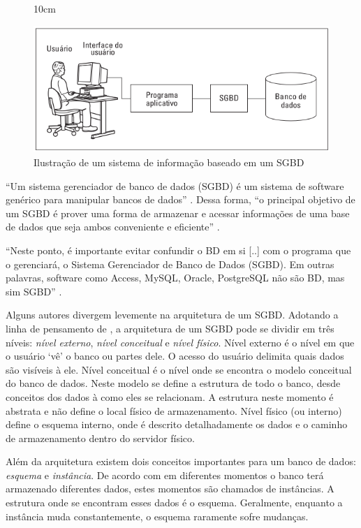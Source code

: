 \begin{figure}[!ht]{10cm}
  \caption{Ilustração de um sistema de informação baseado em um SGBD} \label{sgbd}
  \includegraphics[width=1\hsize]{figuras/esquema_sgbd.png}
\end{figure}
``Um sistema gerenciador de banco de dados (SGBD) é um
sistema de software genérico para manipular bancos de dados'' \cite[p.2]{teorey2014projeto}. Dessa forma, ``o principal objetivo de um SGBD é prover uma forma de armazenar e acessar informações de uma base de dados que seja ambos conveniente e eficiente'' \cite[p.1]{korth2010database}.

``Neste ponto, é importante evitar confundir o BD em si [..] com o programa que o gerenciará, o Sistema Gerenciador de Banco de Dados (SGBD). Em outras palavras, software como Access, MySQL, Oracle, PostgreSQL não são BD, mas sim SGBD'' \cite[p.2]{clickgeogeoprocessamento}.

Alguns autores divergem levemente na arquitetura de um SGBD. Adotando a linha de pensamento de , a arquitetura de um SGBD pode se dividir em três níveis: \textit{nível externo}, \textit{nível conceitual} e \textit{nível físico}.
Nível externo é o nível em que o usuário `vê' o banco ou partes dele. O acesso do usuário delimita quais dados são visíveis à ele.
Nível conceitual é o nível onde se encontra o modelo conceitual do banco de dados. Neste modelo se define a estrutura de todo o banco, desde conceitos dos dados à como eles se relacionam. A estrutura neste momento é abstrata e não define o local físico de armazenamento. 
Nível físico (ou interno) define o esquema interno, onde é descrito detalhadamente os dados e o caminho de armazenamento dentro do servidor físico. 

Além da arquitetura existem dois conceitos importantes para um banco de dados: \textit{esquema} e \textit{instância}. De acordo com  em diferentes momentos o banco terá armazenado diferentes dados, estes momentos são chamados de instâncias. A estrutura onde se encontram esses dados é o esquema. Geralmente, enquanto a instância muda constantemente, o esquema raramente sofre mudanças.

